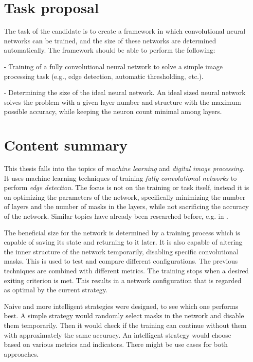\documentclass[12pt]{report}
\begin{document}
\chapter*{Task proposal}

The task of the candidate is to create a framework in which convolutional neural networks can be trained, and the size of these networks are determined automatically. The framework should be able to perform the following:

- Training of a fully convolutional neural network to solve a simple image processing task (e.g., edge detection, automatic thresholding, etc.).

- Determining the size of the ideal neural network. An ideal sized neural network solves the problem with a given layer number and structure with the maximum possible accuracy, while keeping the neuron count minimal among layers.

\chapter*{Content summary}

This thesis falls into the topics of \textit{machine learning} and \textit{digital image processing}. It uses machine learning techniques of training \textit{fully convolutional networks} to perform \textit{edge detection}. The focus is not on the training or task itself, instead it is on optimizing the parameters of the network, specifically minimizing the number of layers and the number of masks in the layers, while not sacrificing the accuracy of the network. Similar topics have already been researched before, e.g. in \cite{pruning_web, pruning_arxiv, understanding}.

The beneficial size for the network is determined by a training process which is capable of saving its state and returning to it later. It is also capable of altering the inner structure of the network temporarily, disabling specific convolutional masks. This is used to test and compare different configurations. The previous techniques are combined with different metrics. The training stops when a desired exiting criterion is met. This results in a network configuration that is regarded as optimal by the current strategy.

Naive and more intelligent strategies were designed, to see which one performs best. A simple strategy would randomly select masks in the network and disable them temporarily. Then it would check if the training can continue without them with approximately the same accuracy. An intelligent strategy would choose based on various metrics and indicators. There might be use cases for both approaches.
\end{document}
